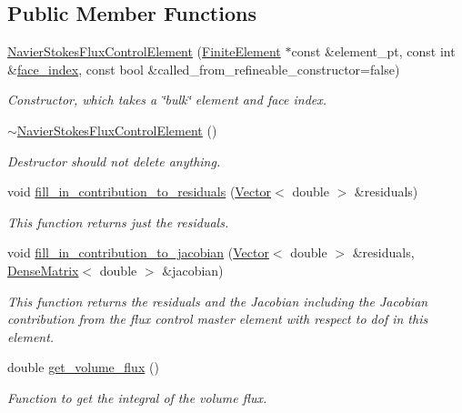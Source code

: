 \subsection*{Public Member Functions}
\begin{DoxyCompactItemize}
\item 
\hyperlink{classoomph_1_1NavierStokesFluxControlElement_a85e1b1b55072f13ca39219ca1fb9a4d6}{Navier\+Stokes\+Flux\+Control\+Element} (\hyperlink{classoomph_1_1FiniteElement}{Finite\+Element} $\ast$const \&element\+\_\+pt, const int \&\hyperlink{classoomph_1_1FaceElement_a478d577ac6db67ecc80f1f02ae3ab170}{face\+\_\+index}, const bool \&called\+\_\+from\+\_\+refineable\+\_\+constructor=false)
\begin{DoxyCompactList}\small\item\em Constructor, which takes a \char`\"{}bulk\char`\"{} element and face index. \end{DoxyCompactList}\item 
\hyperlink{classoomph_1_1NavierStokesFluxControlElement_a5d2ae1598fc1a68be1abf01b20e54529}{$\sim$\+Navier\+Stokes\+Flux\+Control\+Element} ()
\begin{DoxyCompactList}\small\item\em Destructor should not delete anything. \end{DoxyCompactList}\item 
void \hyperlink{classoomph_1_1NavierStokesFluxControlElement_ad612e8f706ba627f11dd380cc20bfab2}{fill\+\_\+in\+\_\+contribution\+\_\+to\+\_\+residuals} (\hyperlink{classoomph_1_1Vector}{Vector}$<$ double $>$ \&residuals)
\begin{DoxyCompactList}\small\item\em This function returns just the residuals. \end{DoxyCompactList}\item 
void \hyperlink{classoomph_1_1NavierStokesFluxControlElement_a6a745b0b8b1417b7f61782e959c31f69}{fill\+\_\+in\+\_\+contribution\+\_\+to\+\_\+jacobian} (\hyperlink{classoomph_1_1Vector}{Vector}$<$ double $>$ \&residuals, \hyperlink{classoomph_1_1DenseMatrix}{Dense\+Matrix}$<$ double $>$ \&jacobian)
\begin{DoxyCompactList}\small\item\em This function returns the residuals and the Jacobian including the Jacobian contribution from the flux control master element with respect to dof in this element. \end{DoxyCompactList}\item 
double \hyperlink{classoomph_1_1NavierStokesFluxControlElement_a3a2ff525c8a522dff91efc61c0b52a80}{get\+\_\+volume\+\_\+flux} ()
\begin{DoxyCompactList}\small\item\em Function to get the integral of the volume flux. \end{DoxyCompactList}\end{DoxyCompactItemize}

